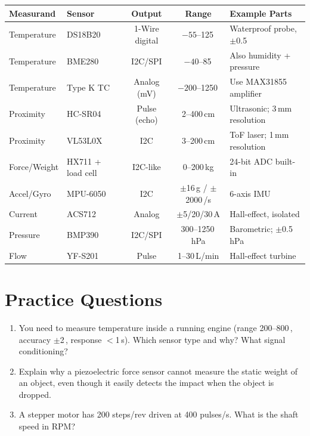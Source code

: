 \begin{quickrefbox}
\begin{table}[H]\centering\small
\begin{tabularx}{\textwidth}{l l c c X}
\toprule
\textbf{Measurand} & \textbf{Sensor} & \textbf{Output} & \textbf{Range} & \textbf{Example Parts} \\
\midrule
Temperature & DS18B20 & 1-Wire digital & $-55$--125\,\degC{} & Waterproof probe, $\pm$0.5\,\degC{} \\
Temperature & BME280 & I2C/SPI & $-40$--85\,\degC{} & Also humidity + pressure \\
Temperature & Type K TC & Analog (mV) & $-200$--1250\,\degC{} & Use MAX31855 amplifier \\
Proximity & HC-SR04 & Pulse (echo) & 2--400\,cm & Ultrasonic; 3\,mm resolution \\
Proximity & VL53L0X & I2C & 3--200\,cm & ToF laser; 1\,mm resolution \\
Force/Weight & HX711 + load cell & I2C-like & 0--200\,kg & 24-bit ADC built-in \\
Accel/Gyro & MPU-6050 & I2C & $\pm$16\,g / $\pm$2000\,\degC{}/s & 6-axis IMU \\
Current & ACS712 & Analog & $\pm$5/20/30\,A & Hall-effect, isolated \\
Pressure & BMP390 & I2C/SPI & 300--1250\,hPa & Barometric; $\pm$0.5\,hPa \\
Flow & YF-S201 & Pulse & 1--30\,L/min & Hall-effect turbine \\
\bottomrule
\end{tabularx}
\end{table}
\end{quickrefbox}

\section{Practice Questions}
\begin{enumerate}[leftmargin=1.5em]
\item You need to measure temperature inside a running engine (range 200--800\,\degC{}, accuracy $\pm$2\,\degC{}, response $<$1\,s). Which sensor type and why? What signal conditioning?
\item Explain why a piezoelectric force sensor cannot measure the static weight of an object, even though it easily detects the impact when the object is dropped.
\item A stepper motor has 200 steps/rev driven at 400 pulses/s. What is the shaft speed in RPM?
\end{enumerate}

